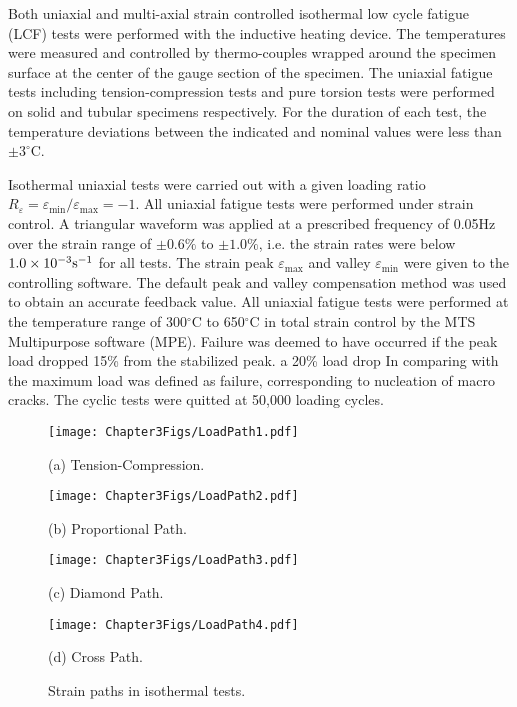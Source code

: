 \documentclass[preprint,5p,twocolumn,11pt,sort&compress]{elsarticle}
\begin{document}
Both uniaxial and multi-axial strain controlled isothermal low cycle fatigue (LCF) tests were performed with the inductive heating device. The temperatures were measured and controlled by thermo-couples wrapped around the specimen surface at the center of the gauge section of the specimen.
The uniaxial fatigue tests including tension-compression tests and pure torsion tests were performed on solid and tubular specimens respectively. For the duration of each test, the temperature deviations between the indicated and nominal values were less than $\pm3^{\circ}$C.

Isothermal uniaxial tests were carried out with a given loading ratio $R_{\varepsilon}=\varepsilon_{\min}/\varepsilon_{\max}=-1$.
All uniaxial fatigue tests were performed under strain control.
A triangular waveform was applied at a prescribed frequency of 0.05Hz over the strain range of $\pm 0.6\%$ to $\pm 1.0\%$, i.e. the strain rates were below $1.0\times 10^{-3}\rm{s}^{-1}$ for all tests.
The strain peak  $\varepsilon_{\max}$ and valley $\varepsilon_{\min}$ were given to the controlling software.
The default peak and valley compensation method was used to obtain an accurate feedback value.
All uniaxial fatigue tests were performed at the temperature range of 300$^{\circ}$C to 650$^{\circ}$C in total strain control by the MTS Multipurpose software (MPE).
Failure was deemed to have occurred if the peak load dropped 15\% from the stabilized peak. a 20\% load drop In comparing with the maximum load  was defined as failure, corresponding to nucleation of macro cracks.
The cyclic tests were quitted at 50,000 loading cycles.

\begin{figure}
  \begin{minipage}[t]{0.5\linewidth}
  \nonumber
    \centering
    \texttt{[image: Chapter3Figs/LoadPath1.pdf]}
    \centerline{\small (a) Tension-Compression.}
  \end{minipage}%
  \begin{minipage}[t]{0.5\linewidth}
    \centering
    \texttt{[image: Chapter3Figs/LoadPath2.pdf]}
    \centerline{\small (b) Proportional Path.}
  \end{minipage}
  \begin{minipage}[t]{0.5\linewidth}
  \nonumber
    \centering
    \texttt{[image: Chapter3Figs/LoadPath3.pdf]}
    \centerline{\small (c) Diamond Path.}
  \end{minipage}%
  \begin{minipage}[t]{0.5\linewidth}
    \centering
    \texttt{[image: Chapter3Figs/LoadPath4.pdf]}
    \centerline{\small (d) Cross Path.}
  \end{minipage}
  \caption{Strain paths in isothermal tests.}
  \label{Fig:LoadPath}
\end{figure}
\end{document}
